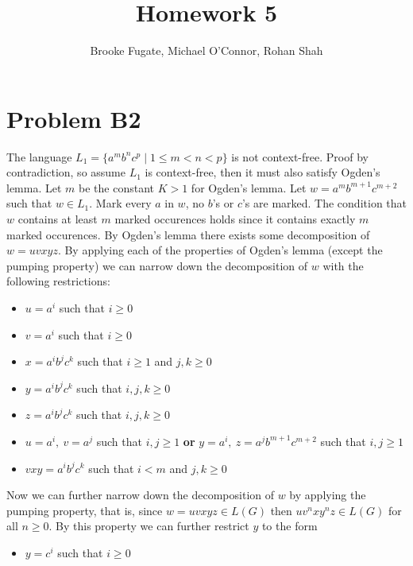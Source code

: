\documentclass[12pt]{article}
\begin{document}
\pagestyle{plain}
\titleformat{\subsection}[runin]
  {\normalfont\large\bfseries}{\thesubsection}{1em}{}

\title{Homework 5}
\author{Brooke Fugate, Michael O'Connor, Rohan Shah}
\date{}

\maketitle

\section*{Problem B2}
The language $L_1 = \{a^mb^nc^p \mid 1\le m<n<p\}$ is not context-free. Proof by
contradiction, so assume $L_1$ is context-free, then it must also satisfy
Ogden's lemma. Let $m$ be the constant $K > 1$ for Ogden's lemma. Let
$w = a^mb^{m+1}c^{m+2}$ such that $w \in L_1$. Mark every $a$ in $w$,
no $b$'s or $c$'s are marked. The condition that $w$ contains at least $m$
marked occurences holds since it contains exactly $m$ marked occurences.
By Ogden's lemma there exists some decomposition of $w = uvxyz$. By applying
each of the properties of Ogden's lemma (except the pumping property) we can
narrow down the decomposition of $w$ with the following restrictions:
\begin{itemize}
\item $u=a^i$ such that $i\ge 0$
\item $v=a^i$ such that $i\ge 0$
\item $x=a^ib^jc^k$ such that $i\ge 1$ and $j,k\ge 0$
\item $y=a^ib^jc^k$ such that $i,j,k\ge 0$
\item $z=a^ib^jc^k$ such that $i,j,k\ge 0$
\item $u=a^i,\ v=a^j$ such that $i,j\ge 1$ \textbf{or}
$y=a^i,\ z=a^jb^{m+1}c^{m+2}$ such that $i,j\ge 1$
\item $vxy = a^ib^jc^k$ such that $i<m$ and $j,k\ge 0$
\end{itemize}
Now we can further narrow down the decomposition of $w$ by applying the pumping
property, that is, since $w = uvxyz \in L(G)$ then $uv^nxy^nz \in L(G)$ for all
$n \ge 0$. By this property we can further restrict $y$ to the form
\begin{itemize}
\item $y=c^i$ such that $i\ge 0$
\end{itemize}
\end{document}
